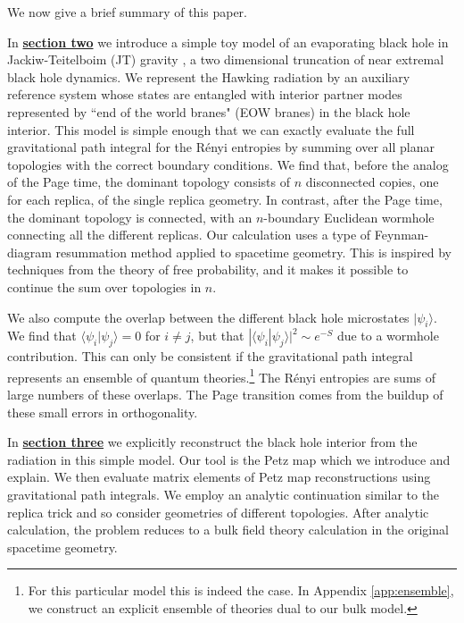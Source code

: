 \documentclass[11pt]{article}
\numberwithin{equation}{section}
\begin{document}
We now give a brief summary of this paper.

In \hyperref[sec:asimplemodel]{{\bf section two}}
we introduce a simple toy model of an evaporating black hole in Jackiw-Teitelboim (JT) gravity \cite{Teitelboim:1983ux,Jackiw:1984je,Almheiri:2014cka}, a two dimensional truncation of near extremal black hole dynamics.   We represent the Hawking radiation by an auxiliary reference system whose states are entangled with interior partner modes represented by ``end of the world branes" (EOW branes) in the black hole interior.   This model is simple enough that we can exactly evaluate the full gravitational path integral for the R\'{e}nyi entropies by summing over all {planar} topologies with the correct boundary conditions.  We find that, before the analog of the Page time, the dominant topology consists of $n$ disconnected copies, one for each replica, of the single replica geometry. In contrast, after the Page time, the dominant topology is connected, with an $n$-boundary Euclidean wormhole connecting all the different replicas. {Our calculation uses a type of Feynman-diagram resummation method applied to spacetime geometry. This is inspired by techniques from the theory of free probability, and it makes it possible to continue the sum over topologies in $n$.}

We also compute the overlap between the different black hole microstates $| \psi_i \rangle$. We find that $\langle \psi_i | \psi_j\rangle = 0$ for $i \neq j$, but that $|\langle \psi_i | \psi_j\rangle |^2 \sim e^{-S}$ due to a wormhole contribution. This can only be consistent if the gravitational path integral represents an ensemble of quantum theories.\footnote{For this particular model this is indeed the case. In Appendix \ref{app:ensemble}, we construct an explicit ensemble of theories dual to our bulk model.}    The R\'{e}nyi entropies are sums of large numbers of these overlaps.  The Page transition comes from the buildup of these small errors in orthogonality.

In \hyperref[sec:petz]{{\bf section three}} we explicitly reconstruct the black hole interior  from the radiation in this simple model.  Our tool is the Petz map which we introduce and explain.   We then evaluate matrix elements of Petz map reconstructions using gravitational path integrals.  We employ  an analytic continuation similar to the replica trick and so consider geometries of different topologies. After analytic calculation, the problem reduces to a bulk field theory calculation in the original spacetime geometry.  
\end{document}
